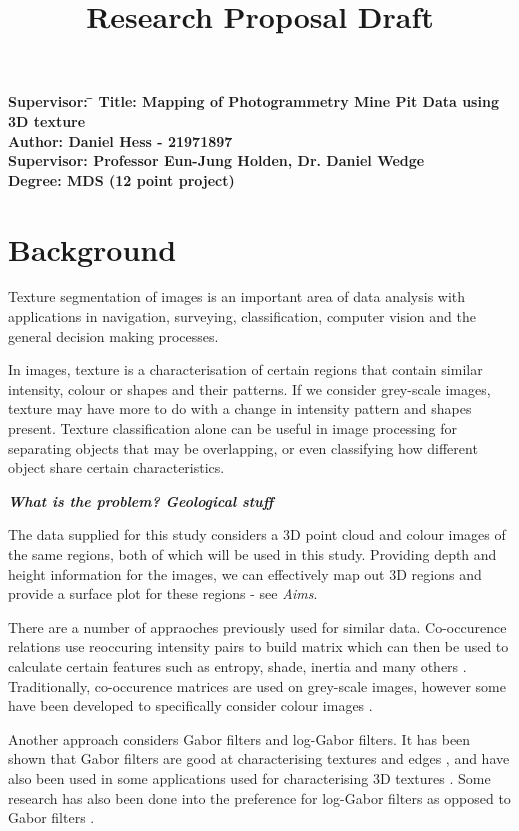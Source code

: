 \documentclass[12pt, a4paper]{article}
\title{Research Proposal Draft}
\date{}
\begin{document}
\maketitle

\begin{tabbing}
\bf Supervisor: \=\kill
\bf Title:   \> Mapping of Photogrammetry Mine Pit Data using 3D texture \\
\bf Author:  \> Daniel Hess - 21971897 \\
\bf Supervisor:   \> Professor Eun-Jung Holden, Dr. Daniel Wedge \\
\bf Degree:   \> MDS (12 point project)
\end{tabbing}

\section*{Background}

Texture segmentation of images is an important area of data analysis with applications in navigation, surveying, classification, computer vision and the general decision making processes. 

In images, texture is a characterisation of certain regions that contain similar intensity, colour or shapes and their patterns. If we consider grey-scale images, texture may have more to do with a change in intensity pattern and shapes present. Texture classification alone can be useful in image processing for separating objects that may be overlapping, or even classifying how different object share certain characteristics.

\textit{\textbf{What is the problem? Geological stuff}}

The data supplied for this study considers a 3D point cloud and colour images of the same regions, both of which will be used in this study. Providing depth and height information for the images, we can effectively map out 3D regions and provide a surface plot for these regions - see \textit{Aims}.

There are a number of appraoches previously used for similar data. Co-occurence relations use reoccuring intensity pairs to build matrix which can then be used to calculate certain features such as entropy, shade, inertia and many others \cite{longstaff1995improving}. Traditionally, co-occurence matrices are used on grey-scale images, however some have been developed to specifically consider colour images \cite{palm2004color}.

Another approach considers Gabor filters and log-Gabor filters. It has been shown that Gabor filters are good at characterising textures and edges \cite{idrissa2002texture}, and have also been used in some applications used for characterising 3D textures \cite{xu2009automatic}. Some research has also been done into the preference for log-Gabor filters as opposed to Gabor filters \cite{nava2011comparison}.
\end{document}
